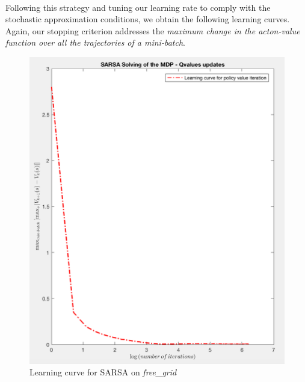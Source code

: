 \documentclass[a4paper]{report}
\begin{document}
{{{				\paragraph{} Following this strategy and tuning our learning rate to comply with the stochastic approximation conditions, we obtain the following learning curves. Again, our stopping criterion addresses the \emph{maximum change in the acton-value function over all the trajectories of a mini-batch}. 
				\begin{figure}[h!]
					\begin{minipage}{0.4\linewidth}
						\includegraphics[width=\linewidth]{sarsa_learning_curve_free_grid}
						\caption{Learning curve for SARSA on \emph{free\_grid}}
					\end{minipage}
					\hfill
					\begin{minipage}{0.4\linewidth}

\end{minipage}
\end{figure}}}}
\end{document}
